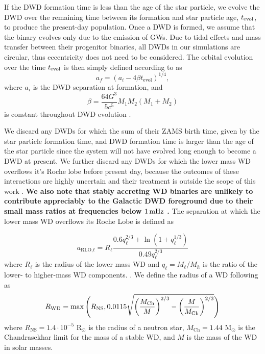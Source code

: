 \documentclass[twocolumn, linenumbers]{aastex631}
\begin{document}
If the DWD formation time is less than the age of the star particle, we evolve the DWD over the remaining time between its formation and star particle age, $t_{\rm{evol}}$, to produce the present-day population. Once a DWD is formed, we assume that the binary evolves only due to the emission of GWs. Due to tidal effects and mass transfer between their progenitor binaries, all DWDs in our simulations are circular, thus eccentricity does not need to be considered. The orbital evolution over the time $t_{\rm{evol}}$ is then simply defined according to \citet{Peters1964} as
\begin{equation}
    a_f = (a_i - 4\beta t_\text{evol})^{1/4},
\end{equation}
where $a_i$ is the DWD separation at formation, and 
\begin{equation}
    \beta = \frac{64G^3}{5c^5} M_1M_2(M_1+M_2)
\end{equation}
is constant throughout DWD evolution \citep{Peters1964}.

We discard any DWDs for which the sum of their ZAMS birth time, given by the star particle formation time, and DWD formation time is larger than the age of the star particle since the system will not have evolved long enough to become a DWD at present. We further discard any DWDs for which the lower mass WD overflows it's Roche lobe before present day, because the outcomes of these interactions are highly uncertain and their treatment is outside the scope of this work \citep[e.g., ][]{Shen2015, Kremer2017}. \textbf{We also note that stably accreting WD binaries are unlikely to contribute appreciably to the Galactic DWD foreground due to their small mass ratios at frequencies below $1\,\rm{mHz}$ \citep{Breivik2018}.} The separation at which the lower mass WD overflows its Roche Lobe is defined as

\begin{equation}
    a_{\text{RLO,}\ell} = R_{\ell} \frac{0.6 q_{\ell}^{2/3} + \ln{(1+q_{\ell}^{1/3})}}{0.49 q_{\ell}^{2/3}}
\end{equation}
where $R_{\ell}$ is the radius of the lower mass WD and $q_{\ell} = M_{\ell}/M_{h}$ is the ratio of the lower- to higher-mass WD components. \citep{Eggleton1983}. 
We define the radius of a WD following \citet{Tout1997, Hurley2000} as
\begin{equation}
    R_{\rm{WD}} = \max\Bigg(R_\text{NS}, 0.0115\sqrt{\left(\frac{M_\text{Ch}}{M}\right)^{2/3}-\left(\frac{M}{M_\text{Ch}}\right)^{2/3}} \Bigg) 
\end{equation}
\noindent where $R_\text{NS} = 1.4\cdot 10^{-5}$ R$_\odot$ is the radius of a neutron star, $M_{\text{Ch}}=1.44$ M$_\odot$ is the Chandrasekhar limit for the mass of a stable WD, and $M$ is the mass of the WD in solar masses. 
\end{document}
